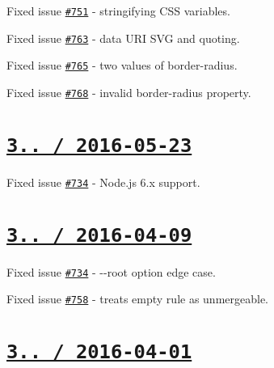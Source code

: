 \begin{DoxyItemize}
\item Fixed issue \href{https://github.com/jakubpawlowicz/clean-css/issues/751}{\tt \#751} -\/ stringifying C\+SS variables.
\item Fixed issue \href{https://github.com/jakubpawlowicz/clean-css/issues/763}{\tt \#763} -\/ data U\+RI S\+VG and quoting.
\item Fixed issue \href{https://github.com/jakubpawlowicz/clean-css/issues/765}{\tt \#765} -\/ two values of border-\/radius.
\item Fixed issue \href{https://github.com/jakubpawlowicz/clean-css/issues/768}{\tt \#768} -\/ invalid border-\/radius property.
\end{DoxyItemize}

\section*{\href{https://github.com/jakubpawlowicz/clean-css/compare/v3.4.12...v3.4.13}{\tt 3.. / 2016-\/05-\/23} }


\begin{DoxyItemize}
\item Fixed issue \href{https://github.com/jakubpawlowicz/clean-css/issues/769}{\tt \#734} -\/ Node.\+js 6.\+x support.
\end{DoxyItemize}

\section*{\href{https://github.com/jakubpawlowicz/clean-css/compare/v3.4.11...v3.4.12}{\tt 3.. / 2016-\/04-\/09} }


\begin{DoxyItemize}
\item Fixed issue \href{https://github.com/jakubpawlowicz/clean-css/issues/734}{\tt \#734} -\/ {\ttfamily -\/-\/root} option edge case.
\item Fixed issue \href{https://github.com/jakubpawlowicz/clean-css/issues/758}{\tt \#758} -\/ treats empty rule as unmergeable.
\end{DoxyItemize}

\section*{\href{https://github.com/jakubpawlowicz/clean-css/compare/v3.4.10...v3.4.11}{\tt 3.. / 2016-\/04-\/01} }



